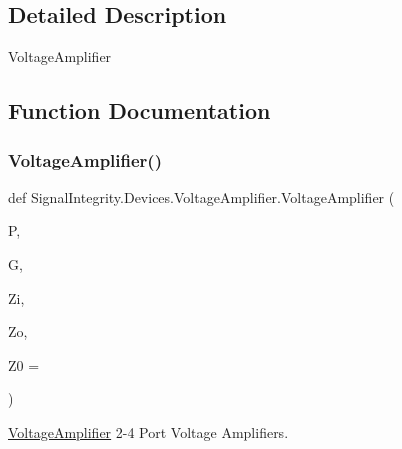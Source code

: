 \subsection{Detailed Description}
\begin{DoxyVerb}VoltageAmplifier\end{DoxyVerb}
 

\subsection{Function Documentation}
\mbox{\label{namespaceSignalIntegrity_1_1Devices_1_1VoltageAmplifier_ad9179e09f759aca4cdecba6b7dc8d6aa}} 
\subsubsection{\texorpdfstring{Voltage\+Amplifier()}{VoltageAmplifier()}}
{\footnotesize\ttfamily def Signal\+Integrity.\+Devices.\+Voltage\+Amplifier.\+Voltage\+Amplifier (\begin{DoxyParamCaption}\item[{}]{P,  }\item[{}]{G,  }\item[{}]{Zi,  }\item[{}]{Zo,  }\item[{}]{Z0 = {} }\end{DoxyParamCaption})}



\hyperlink{namespaceSignalIntegrity_1_1Devices_1_1VoltageAmplifier}{Voltage\+Amplifier} 2-\/4 Port Voltage Amplifiers. 


